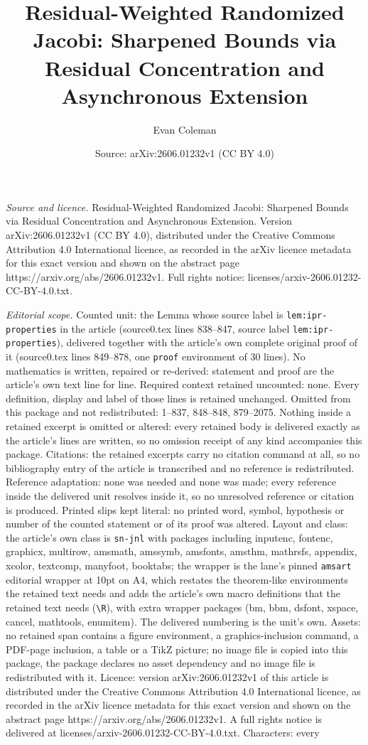 \documentclass[10pt,a4paper]{amsart}
\title[Residual-Weighted Randomized Jacobi: Sharpened Bounds via Re]{Residual-Weighted Randomized Jacobi: Sharpened Bounds via Residual Concentration and Asynchronous Extension}
\author{Evan Coleman}
\date{Source: arXiv:2606.01232v1 (CC BY 4.0)}
\begin{document}
\maketitle

\noindent\emph{Source and licence.} Residual-Weighted Randomized Jacobi: Sharpened Bounds via Residual Concentration and Asynchronous Extension. Version arXiv:2606.01232v1 (CC BY 4.0), distributed under the Creative Commons Attribution 4.0 International licence, as recorded in the arXiv licence metadata for this exact version and shown on the abstract page https://arxiv.org/abs/2606.01232v1. Full rights notice: licenses/arxiv-2606.01232-CC-BY-4.0.txt.\par\smallskip

\noindent\textit{Editorial scope.} Counted unit: the Lemma whose source label is \texttt{lem:ipr-properties} in the article (source0.tex lines 838--847, source label \texttt{lem:ipr-properties}), delivered together with the article's own complete original proof of it (source0.tex lines 849--878, one \texttt{proof} environment of 30 lines). No mathematics is written, repaired or re-derived: statement and proof are the article's own text line for line. Required context retained uncounted: none. Every definition, display and label of those lines is retained unchanged. Omitted from this package and not redistributed: 1--837, 848--848, 879--2075. Nothing inside a retained excerpt is omitted or altered: every retained body is delivered exactly as the article's lines are written, so no omission receipt of any kind accompanies this package. Citations: the retained excerpts carry no citation command at all, so no bibliography entry of the article is transcribed and no reference is redistributed. Reference adaptation: none was needed and none was made; every reference inside the delivered unit resolves inside it, so no unresolved reference or citation is produced. Printed slips kept literal: no printed word, symbol, hypothesis or number of the counted statement or of its proof was altered. Layout and class: the article's own class is \texttt{sn-jnl} with packages including inputenc, fontenc, graphicx, multirow, amsmath, amssymb, amsfonts, amsthm, mathrsfs, appendix, xcolor, textcomp, manyfoot, booktabs; the wrapper is the lane's pinned \texttt{amsart} editorial wrapper at 10pt on A4, which restates the theorem-like environments the retained text needs and adds the article's own macro definitions that the retained text needs (\texttt{\textbackslash R}), with extra wrapper packages (bm, bbm, dsfont, xspace, cancel, mathtools, enumitem). The delivered numbering is the unit's own. Assets: no retained span contains a figure environment, a graphics-inclusion command, a PDF-page inclusion, a table or a TikZ picture; no image file is copied into this package, the package declares no asset dependency and no image file is redistributed with it. Licence: version arXiv:2606.01232v1 of this article is distributed under the Creative Commons Attribution 4.0 International licence, as recorded in the arXiv licence metadata for this exact version and shown on the abstract page https://arxiv.org/abs/2606.01232v1. A full rights notice is delivered at licenses/arxiv-2606.01232-CC-BY-4.0.txt. Characters: every 
\end{document}
